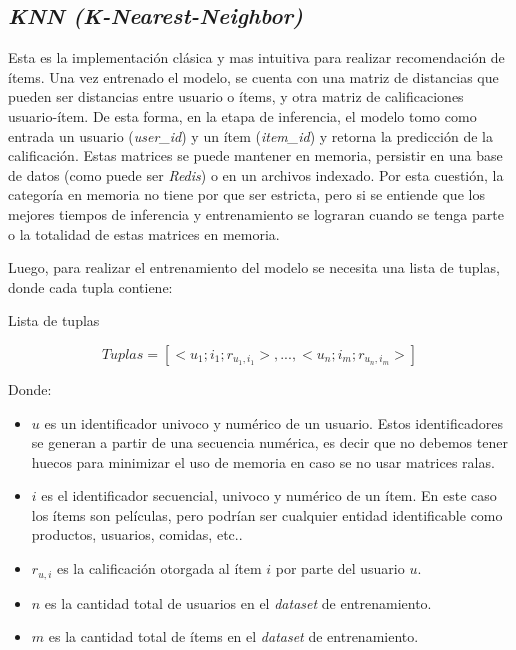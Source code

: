 \documentclass[11pt,a4paper,twoside]{thesis}
\begin{document}
\subsection{\textit{KNN (K-Nearest-Neighbor)}}

Esta es la implementación clásica y mas intuitiva para realizar recomendación
de ítems. Una vez entrenado el modelo, se cuenta con una matriz de distancias
que pueden ser distancias entre usuario o ítems, y otra matriz de
calificaciones usuario-ítem. De esta forma, en la etapa de inferencia, el
modelo tomo como entrada un usuario (\textit{user\_id}) y un ítem
(\textit{item\_id}) y retorna la predicción de la calificación. Estas matrices
se puede mantener en memoria, persistir en una base de datos (como puede ser
\textit{Redis}) o en un archivos indexado. Por esta cuestión, la categoría en
memoria no tiene por que ser estricta, pero si se entiende que los mejores
tiempos de inferencia y entrenamiento se lograran cuando se tenga parte o la
totalidad de estas matrices en memoria.

\clearpage
Luego, para realizar el entrenamiento del modelo se necesita una lista de tuplas, donde cada tupla contiene:

\begin{description}
	\item[Lista de tuplas]
\end{description}
\begin{equation}
	Tuplas = [<u_1; i_1; r_{u_1, i_1}>,...,<u_n; i_m; r_{u_n, i_m}>]
\end{equation}
\begin{description}
	\item[Donde:]
\end{description}
\begin{itemize}
	\item $u$ es un identificador univoco y numérico de un usuario. Estos identificadores se generan a partir de una secuencia numérica, es decir que no debemos tener huecos para minimizar el uso de memoria en caso se no usar matrices ralas.
	\item $i$ es el identificador secuencial, univoco y numérico de un ítem. En este caso los ítems son películas, pero podrían ser cualquier entidad identificable como productos, usuarios, comidas, etc..
	\item $r_{u, i}$ es la calificación otorgada al ítem $i$ por parte del usuario $u$.
	\item $n$ es la cantidad total de usuarios en el \textit{dataset} de entrenamiento.
	\item $m$ es la cantidad total de ítems en el \textit{dataset} de entrenamiento.
\end{itemize}
\end{document}

